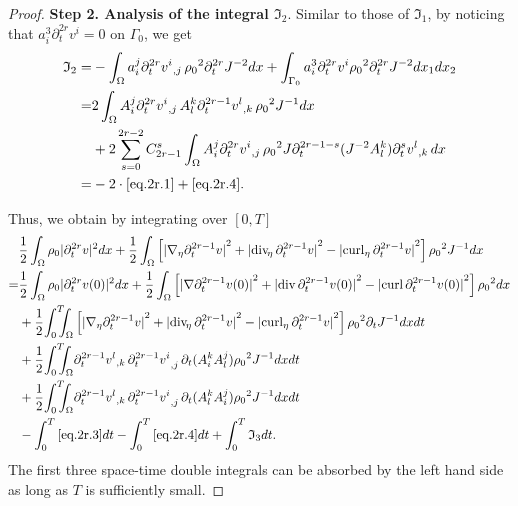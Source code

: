 \documentclass[12pt,twoside,reqno]{amsart}
\numberwithin{equation}{section}
\theoremstyle{definition}
\theoremstyle{remark}
\begin{document}
\begin{proof}
\textbf{Step 2. Analysis of the integral ${\mathfrak{I}}_2$}.
Similar to those of ${\mathfrak{I}}_1$, by noticing that $a^3_i{\partial}_t^{2r}v^i=0$ on $\Gamma_0$, we get
\begin{align}
  {\mathfrak{I}}_2=&-\int_\Omega a^j_i{\partial}_t^{2r}{{{v^i}}_{,{j}}\,}{\rho_0}^2  {\partial}_t^{2r} J^{-2}dx
  +\int_{\Gamma_0} a^3_i{\partial}_t^{2r}v^i{\rho_0}^2  {\partial}_t^{2r} J^{-2}dx_1dx_2{\nonumber}\\
  =&2\int_\Omega A^j_i{\partial}_t^{2r}{{{v^i}}_{,{j}}\,}A_l^k {\partial}_t^{2r-1}{{{v^l}}_{,{k}}\,}{\rho_0}^2   J^{-1}dx{\nonumber}\\
  &+2\sum_{s=0}^{2r-2}C_{2r-1}^s\int_\Omega A^j_i{\partial}_t^{2r}{{{v^i}}_{,{j}}\,}{\rho_0}^2  J{\partial}_t^{2r-1-s} (J^{-2}A_l^k){\partial}_t^s {{{v^l}}_{,{k}}\,}dx\label{eq.2r.4}\\
  =&-2 \cdot\eqref{eq.2r.1}+\eqref{eq.2r.4}.{\nonumber}
\end{align}

Thus, we obtain by integrating over $[0,T]$
\begin{align*}
&\frac{1}{2}\int_\Omega {\rho_0} |{\partial}_t^{2r} v|^2dx+\frac{1}{2}\int_\Omega \left[{\vert{{\nabla}_\eta {\partial}_t^{2r-1}v}\vert}^2+{\vert{{\mathrm{div}_{\!\eta}\,} {\partial}_t^{2r-1} v}\vert}^2-{\vert{{\mathrm{curl}_\eta\,} {\partial}_t^{2r-1}v}\vert}^2\right]{\rho_0}^2  J^{-1}dx\\
  =&\frac{1}{2}\int_\Omega {\rho_0} |{\partial}_t^{2r} v(0)|^2dx+\frac{1}{2}\int_\Omega \left[{\vert{{\nabla} {\partial}_t^{2r-1}v(0)}\vert}^2+{\vert{{\mathrm{div}\,} {\partial}_t^{2r-1} v(0)}\vert}^2-{\vert{{\mathrm{curl}\,}  {\partial}_t^{2r-1}v(0)}\vert}^2\right]{\rho_0}^2  dx\\
 &+\frac{1}{2}{\int_0^T\!\!\!\!\int_\Omega }  \left[{\vert{{\nabla}_\eta {\partial}_t^{2r-1}v}\vert}^2+{\vert{{\mathrm{div}_{\!\eta}\,} {\partial}_t^{2r-1} v}\vert}^2-{\vert{{\mathrm{curl}_\eta\,} {\partial}_t^{2r-1}v}\vert}^2\right]{\rho_0}^2  {\partial}_t J^{-1}dxdt\\
  &+\frac{1}{2}{\int_0^T\!\!\!\!\int_\Omega }  {\partial}_t^{2r-1}{{{v^l}}_{,{k}}\,} {{{{\partial}_t^{2r-1}v^i}}_{,{j}}\,}{\partial}_t(A_i^kA_l^j){\rho_0}^2  J^{-1}dxdt\\
  &+\frac1{2}{\int_0^T\!\!\!\!\int_\Omega }  {\partial}_t^{2r-1}{{{v^l}}_{,{k}}\,} {{{{\partial}_t^{2r-1}v^i}}_{,{j}}\,}{\partial}_t(A_l^k A_{i}^j){\rho_0}^2  J^{-1}dxdt \\
  &-\int_0^T\eqref{eq.2r.3}dt-\int_0^T\eqref{eq.2r.4}dt+\int_0^T{\mathfrak{I}}_3dt.
\end{align*}
The  first three space-time double integrals can be absorbed by the left hand side as long as $T$ is sufficiently small.


\end{proof}
\end{document}
